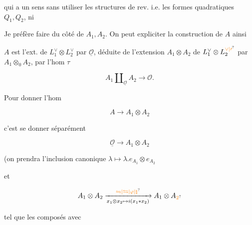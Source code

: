 qui a  un sens sans utiliser les structures de rev. i.e. les formes quadratiques $Q_1,Q_2$, ni 



Je préfère faire  du côté de $A_1,A_2$. On peut expliciter la construction de $A$ ainsi



$A$  est l'ext. de $L_1^\vee\otimes L_2^\vee$ par $\underline{\mathcal O}$, déduite de l'extension $A_1\otimes A_2$ de $L_1^\vee\otimes L_{2}^{\unsure{\vee|\prime}}$ par $A_1\otimes_0 A_2$, par l'hom $\tau$

\[
A_1\amalg_{\underline{\mathcal O}}A_2\longrightarrow\mathcal O.
\]

Pour donner l'hom

\[
A\longrightarrow A_1\otimes A_2
\]

c'est se donner séparément

\[
\underline{\mathcal O}\longrightarrow A_1\otimes A_2
\]

(on prendra l'inclusion canonique $\lambda\longmapsto\lambda.e_{A_1}\otimes e_{A_2}$

et

\[
A_1\otimes A_2\xrightarrow[x_1\otimes x_2\mapsto i(x_1*x_2)]{\unsure{\leftrightharpoons|\leftrightarrows|\varphi|\natural}}A_1\otimes A_{\unsure{2}}
\]

tel que les composés avec


